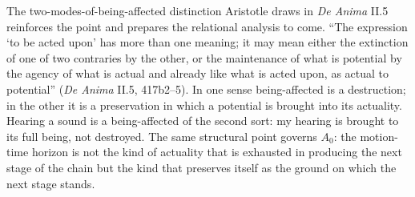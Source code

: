 \documentclass{article}
\begin{document}
The two-modes-of-being-affected distinction Aristotle draws in \textit{De Anima} II.5 reinforces the point and prepares the relational analysis to come. ``The expression `to be acted upon' has more than one meaning; it may mean either the extinction of one of two contraries by the other, or the maintenance of what is potential by the agency of what is actual and already like what is acted upon, as actual to potential'' (\textit{De Anima} II.5, 417b2--5). In one sense being-affected is a destruction; in the other it is a preservation in which a potential is brought into its actuality. Hearing a sound is a being-affected of the second sort: my hearing is brought to its full being, not destroyed. The same structural point governs $A_0$: the motion-time horizon is not the kind of actuality that is exhausted in producing the next stage of the chain but the kind that preserves itself as the ground on which the next stage stands.
\end{document}
